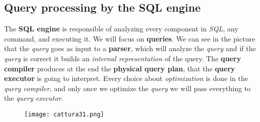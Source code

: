 \documentclass{article}
\begin{document}
\subsection{Query processing by the SQL engine}
The \textbf{SQL engine} is responsible of analyzing every component in \emph{SQL}, any command, and executing it. We will focus on \textbf{queries}. We can see in the picture that the \emph{query} goes as input to a \textbf{parser}, which will analyze the \emph{query} and if the \emph{query} is correct it builds an \emph{internal representation} of the query. The \textbf{query compiler} produces at the end the \textbf{physical query plan}, that the \textbf{query executor} is going to interpret. Every choice about \emph{optimization} is done in the \emph{query compiler}, and only once we optimize the \emph{query} we will pass everything to the \emph{query executor. }
\begin{figure}[H]
  \centering
  \texttt{[image: cattura31.png]}
\end{figure}
\end{document}
